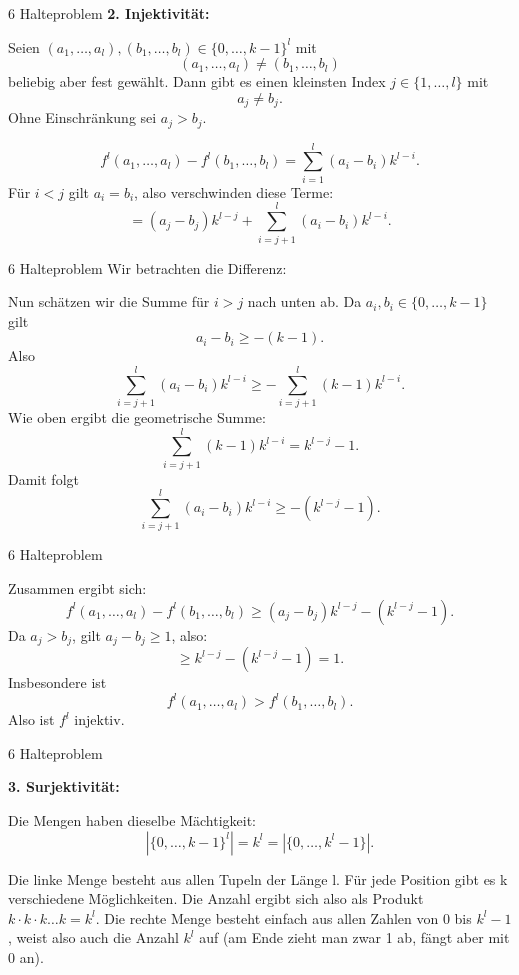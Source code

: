 \documentclass{beamer}
\begin{document}
\begin{frame}{6 Halteproblem}
    \textbf{2. Injektivität:}

Seien $(a_1,\dots,a_l),(b_1,\dots,b_l) \in \{0,\dots,k-1\}^l$ mit
\[
(a_1,\dots,a_l) \ne (b_1,\dots,b_l)
\] 
beliebig aber fest gewählt.
Dann gibt es einen kleinsten Index $j \in \{1,\dots,l\}$ mit
\[
a_j \ne b_j.
\]
Ohne Einschränkung sei $a_j > b_j$.

\[
f^l(a_1,\dots,a_l) - f^l(b_1,\dots,b_l)
= \sum_{i=1}^l (a_i - b_i)k^{l-i}.
\]
Für $i<j$ gilt $a_i = b_i$, also verschwinden diese Terme:
\[
= (a_j - b_j)k^{l-j} + \sum_{i=j+1}^l (a_i - b_i)k^{l-i}.
\]
\end{frame}

\begin{frame}{6 Halteproblem}
    Wir betrachten die Differenz:


Nun schätzen wir die Summe für $i>j$ nach unten ab. Da $a_i,b_i \in \{0,\dots,k-1\}$ gilt
\[
a_i - b_i \ge -(k-1).
\]
Also
\[
\sum_{i=j+1}^l (a_i - b_i)k^{l-i}
\ge -\sum_{i=j+1}^l (k-1)k^{l-i}.
\]
Wie oben ergibt die geometrische Summe:
\[
\sum_{i=j+1}^l (k-1)k^{l-i}
= k^{l-j} - 1.
\]
Damit folgt
\[
\sum_{i=j+1}^l (a_i - b_i)k^{l-i}
\ge -(k^{l-j} - 1).
\]

\end{frame}

\begin{frame}{6 Halteproblem}
    
Zusammen ergibt sich:
\[
f^l(a_1,\dots,a_l) - f^l(b_1,\dots,b_l)
\ge (a_j - b_j)k^{l-j} - (k^{l-j} - 1).
\]
Da $a_j > b_j$, gilt $a_j - b_j \ge 1$, also:
\[
\ge k^{l-j} - (k^{l-j} - 1) = 1.
\]
Insbesondere ist
\[
f^l(a_1,\dots,a_l) > f^l(b_1,\dots,b_l).
\]
Also ist $f^l$ injektiv.

\end{frame}

\begin{frame}{6 Halteproblem}

\textbf{3. Surjektivität:}

Die Mengen haben dieselbe Mächtigkeit:
\[
|\{0,\dots,k-1\}^l| = k^l = |\{0,\dots,k^l-1\}|.
\]

Die linke Menge besteht aus allen Tupeln der Länge l. Für jede Position gibt es k verschiedene Möglichkeiten. Die Anzahl ergibt sich also als Produkt $k\cdot k\cdot k \dots k = k^l$. Die rechte Menge besteht einfach aus allen Zahlen von 0 bis $k^l-1$, weist also auch die Anzahl $k^l$ auf (am Ende zieht man zwar 1 ab, fängt aber mit 0 an).

\end{frame}
\end{document}
